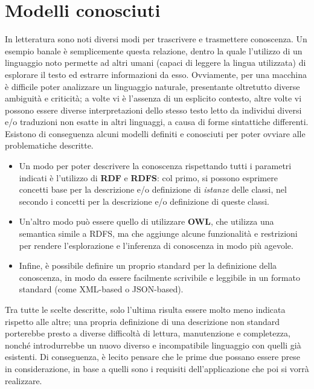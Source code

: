 \documentclass[12pt,a4paper,openright,oneside]{report}
\begin{document}
\section{Modelli conosciuti}
In letteratura sono noti diversi modi per trascrivere e trasmettere conoscenza. Un esempio banale è semplicemente questa relazione, dentro la quale l'utilizzo di un linguaggio noto permette ad altri umani (capaci di leggere la lingua utilizzata) di esplorare il testo ed estrarre informazioni da esso. Ovviamente, per una macchina è difficile poter analizzare un linguaggio naturale, presentante oltretutto diverse ambiguità e criticità; a volte vi è l'assenza di un esplicito contesto, altre volte vi possono essere diverse interpretazioni dello stesso testo letto da individui diversi e/o traduzioni non esatte in altri linguaggi, a causa di forme sintattiche differenti.\\

Esistono di conseguenza alcuni modelli definiti e conosciuti per poter ovviare alle problematiche descritte. 

\begin{itemize}
	\item Un modo per poter descrivere la conoscenza rispettando tutti i parametri indicati è l'utilizzo di \textbf{RDF} e \textbf{RDFS}: col primo, si possono esprimere concetti base per la descrizione e/o definizione di \textit{istanze} delle classi, nel secondo i concetti per la descrizione e/o definizione di queste classi.
	
	\item Un'altro modo può essere quello di utilizzare \textbf{OWL}, che utilizza una semantica simile a RDFS, ma che aggiunge alcune funzionalità e restrizioni per rendere l'esplorazione e l'inferenza di conoscenza in modo più agevole.
	
	\item Infine, è possibile definire un proprio standard per la definizione della conoscenza, in modo da essere facilmente scrivibile e leggibile in un formato standard (come XML-based o JSON-based).
\end{itemize}

Tra tutte le scelte descritte, solo l'ultima risulta essere molto meno indicata rispetto alle altre; una propria definizione di una descrizione non standard porterebbe presto a diverse difficoltà di lettura, manutenzione e completezza, nonché introdurrebbe un nuovo diverso e incompatibile linguaggio con quelli già esistenti. Di conseguenza, è lecito pensare che le prime due possano essere prese in considerazione, in base a quelli sono i requisiti dell'applicazione che poi si vorrà realizzare.\\
\end{document}
